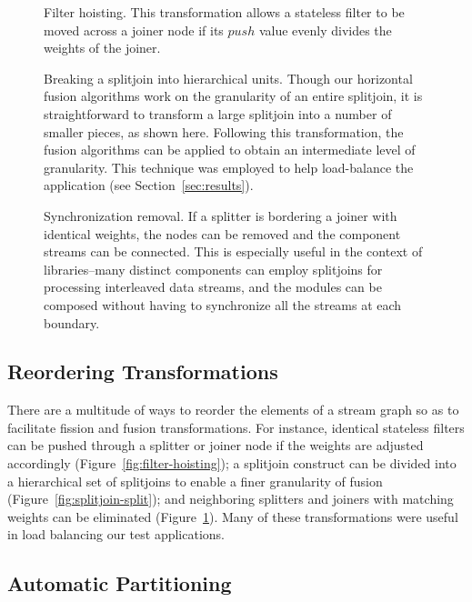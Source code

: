 \begin{figure}
\centering
{}
\caption{\protect\small Filter hoisting.  This transformation allows a
stateless filter to be moved across a joiner node if its $push$ value
evenly divides the weights of the joiner.
\protect\label{fig:filter-hoisting}}
\vspace{12pt}
\caption{\protect\small Breaking a splitjoin into hierarchical units.
Though our horizontal fusion algorithms work on the granularity of an
entire splitjoin, it is straightforward to transform a large splitjoin
into a number of smaller pieces, as shown here.  Following this
transformation, the fusion algorithms can be applied to obtain an
intermediate level of granularity.  This technique was employed to
help load-balance the \Radar~ application (see Section~\ref{sec:results}).
\protect\label{fig:splitjoin-split}}
\vspace{12pt}
\caption{\protect\small Synchronization removal.  If a splitter is
bordering a joiner with identical weights, the nodes can be removed
and the component streams can be connected.  This is especially useful
in the context of libraries--many distinct components can employ
splitjoins for processing interleaved data streams, and the modules
can be composed without having to synchronize all the streams at each
boundary.  \protect\label{fig:sync-removal}}
\vspace{-6pt}
\end{figure}

\subsection{Reordering Transformations}
There are a multitude of ways to reorder the elements of a stream
graph so as to facilitate fission and fusion transformations.  For
instance, identical stateless filters can be pushed through a splitter
or joiner node if the weights are adjusted accordingly
(Figure~\ref{fig:filter-hoisting}); a splitjoin construct can be
divided into a hierarchical set of splitjoins to enable a finer
granularity of fusion (Figure~\ref{fig:splitjoin-split}); and
neighboring splitters and joiners with matching weights can be
eliminated (Figure~\ref{fig:sync-removal}).  Many of these
transformations were useful in load balancing our test applications.

\subsection{Automatic Partitioning}

